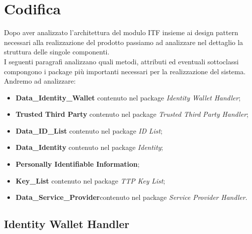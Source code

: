 
\chapter{Codifica}
\label{cap:codifica}
Dopo aver analizzato l'architettura del modulo \gls{ITF} insieme ai design pattern necessari alla realizzazione del prodotto passiamo ad analizzare nel dettaglio la struttura delle singole componenti.\\
I seguenti paragrafi analizzano quali metodi, attributi ed eventuali sottoclassi compongono i package più importanti necessari per la realizzazione del sistema.\\
Andremo ad analizzare:
\begin{itemize}
	\item \textbf{Data\_Identity\_Wallet} contenuto nel package \textit{Identity Wallet Handler};
	\item \textbf{Trusted Third Party} contenuto nel package \textit{Trusted Third Party Handler};
	\item \textbf{Data\_ID\_List} contenuto nel package \textit{ID List};
	\item \textbf{Data\_Identity} contenuto nel package \textit{Identity};
	\item \textbf{Personally Identifiable Information};
	\item \textbf{Key\_List} contenuto nel package \textit{TTP Key List};
	\item \textbf{Data\_Service\_Provider}contenuto nel package \textit{Service Provider Handler}.
\end{itemize}
\newpage
\section{Identity Wallet Handler}

